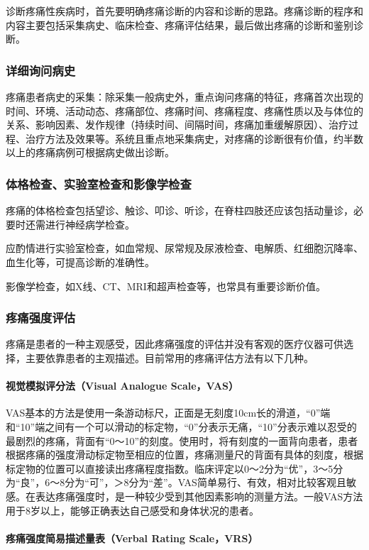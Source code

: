 诊断疼痛性疾病时，首先要明确疼痛诊断的内容和诊断的思路。疼痛诊断的程序和内容主要包括采集病史、临床检查、疼痛评估结果，最后做出疼痛的诊断和鉴别诊断。

\subsubsection{详细询问病史}

疼痛患者病史的采集：除采集一般病史外，重点询问疼痛的特征，疼痛首次出现的时间、环境、活动动态、疼痛部位、疼痛时间、疼痛程度、疼痛性质以及与体位的关系、影响因素、发作规律（持续时间、间隔时间，疼痛加重缓解原因）、治疗过程、治疗方法及效果等。系统且重点地采集病史，对疼痛的诊断很有价值，约半数以上的疼痛病例可根据病史做出诊断。

\subsubsection{体格检查、实验室检查和影像学检查}

疼痛的体格检查包括望诊、触诊、叩诊、听诊，在脊柱四肢还应该包括动量诊，必要时还需进行神经病学检查。

应酌情进行实验室检查，如血常规、尿常规及尿液检查、电解质、红细胞沉降率、血生化等，可提高诊断的准确性。

影像学检查，如X线、CT、MRI和超声检查等，也常具有重要诊断价值。

\subsubsection{疼痛强度评估}

疼痛是患者的一种主观感受，因此疼痛强度的评估并没有客观的医疗仪器可供选择，主要依靠患者的主观描述。目前常用的疼痛评估方法有以下几种。
\paragraph{视觉模拟评分法（Visual Analogue Scale，VAS）}

VAS基本的方法是使用一条游动标尺，正面是无刻度10cm长的滑道，“0”端和“10”端之间有一个可以滑动的标定物，“0”分表示无痛，“10”分表示难以忍受的最剧烈的疼痛，背面有“0～10”的刻度。使用时，将有刻度的一面背向患者，患者根据疼痛的强度滑动标定物至相应的位置，疼痛测量尺的背面有具体的刻度，根据标定物的位置可以直接读出疼痛程度指数。临床评定以0～2分为“优”，3～5分为“良”，6～8分为“可”，＞8分为“差”。VAS简单易行、有效，相对比较客观且敏感。在表达疼痛强度时，是一种较少受到其他因素影响的测量方法。一般VAS方法用于8岁以上，能够正确表达自己感受和身体状况的患者。
\paragraph{疼痛强度简易描述量表（Verbal Rating Scale，VRS）}

